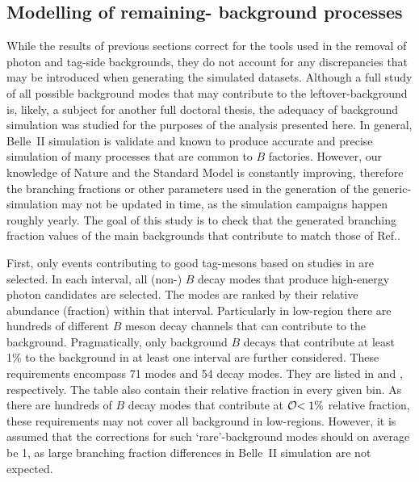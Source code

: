 \subsection{Modelling of remaining-\texorpdfstring{\BB}{BB} background processes}

While the results of previous sections correct for the tools used in the removal of photon and tag-side backgrounds, they do not account for any discrepancies that may be introduced when generating the simulated datasets.
Although a full study of all possible background modes that may contribute to the leftover-\BB background is, likely, a subject for another full doctoral thesis, the adequacy of background simulation was studied for the purposes of the analysis presented here.
In general, Belle~II simulation is validate and known to produce accurate and precise simulation of many processes that are common to $B$ factories.
However, our knowledge of Nature and the Standard Model is constantly improving, therefore the branching fractions or other parameters used in the generation of the generic-\BB simulation may not be updated in time, as the simulation campaigns happen roughly yearly.
The goal of this study is to check that the generated branching fraction values of the main backgrounds that contribute to \BtoXsgamma match those of Ref.\cite{Workman:2022ynf}.

First, only events contributing to good tag-\B mesons based on studies in  are selected.
In each \EB interval, all (non-\BtoXsgamma) $B$ decay modes that produce high-energy photon candidates are selected.
The modes are ranked by their relative abundance (fraction) within that \EB interval.
Particularly in low-\EB region there are hundreds of different $B$ meson decay channels that can contribute to the background.
Pragmatically, only background $B$ decays that contribute at least 1\% to the background in at least one \EB interval are further considered.
These requirements encompass 71 \Bp modes and 54 \Bz decay modes. 
They are listed in  and , respectively.
The table also contain their relative fraction in every given bin.
As there are hundreds of $B$ decay modes that contribute at ${\cal O}{<1\%}$ relative fraction, these requirements may not cover all background in low-\EB regions. 
However, it is assumed that the corrections for such `rare'-background modes should on average be 1, as large branching fraction differences in Belle~II simulation are not expected.

